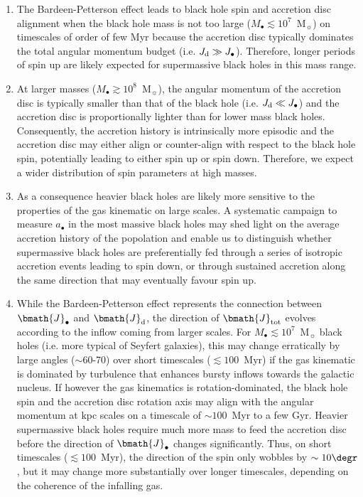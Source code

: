 \documentclass[a4paper,fleqn,usenatbib]{mnras}
\begin{document}
\begin{enumerate}
\item The Bardeen-Petterson effect leads to black hole spin and accretion disc alignment when the black hole mass is not too large ($M_{\bullet} \lesssim 10^7$~M$_{\sun}$) on timescales of order of few Myr because the accretion disc typically dominates the total angular momentum budget (i.e. $J_{\rm d} \gg J_{\bullet}$).
Therefore, longer periods of spin up are likely expected for supermassive black holes in this mass range. 
\item At larger masses ($M_{\bullet} \gtrsim 10^8$~M$_{\sun}$), the angular momentum of the accretion disc is typically smaller than that of the black hole (i.e. $J_{\rm d} \ll J_{\bullet}$) and the accretion disc is proportionally lighter than for lower mass black holes.
Consequently, the accretion history is intrinsically more episodic and the accretion disc may either align or counter-align with respect to the black hole spin, potentially leading to either spin up or spin down.
Therefore, we expect a wider distribution of spin parameters at high masses. 
\item As a consequence heavier black holes are likely more sensitive to the properties of the gas kinematic on large scales.
A systematic campaign to measure $a_{\bullet}$ in the most massive black holes may shed light on the average accretion history of the popolation and enable us to distinguish whether supermassive black holes are preferentially fed through a series of isotropic accretion events leading to spin down, or through sustained accretion along the same direction that may eventually favour spin up. 
\item While the Bardeen-Petterson effect represents the connection between $\bmath{J}_{\bullet}$ and $\bmath{J}_{\rm d}$, the direction of $\bmath{J}_{\rm tot}$ evolves according to the inflow coming from larger scales.
For $M_{\bullet} \lesssim 10^7$~M$_{\sun}$ black holes (i.e. more typical of Seyfert galaxies), this may change erratically by large angles ($\sim 60$-70\degr) over short timescales ($\lesssim 100$~Myr) if the gas kinematic is dominated by turbulence that enhances bursty inflows towards the galactic nucleus.
If however the gas kinematics is rotation-dominated, the black hole spin and the accretion disc rotation axis may align with the angular momentum at kpc scales on a timescale of $\sim 100$~Myr to a few Gyr.
Heavier supermassive black holes require much more mass to feed the accretion disc before the direction of $\bmath{J}_{\bullet}$ changes significantly.
Thus, on short timescales ($\lesssim 100$~Myr), the direction of the spin only wobbles by $\sim 10\degr$, but it may change more substantially over longer timescales, depending on the coherence of the infalling gas. 
\end{enumerate}
\end{document}
